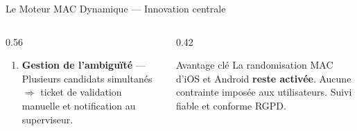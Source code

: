 \documentclass[aspectratio=169, 10pt]{beamer}
\begin{document}
\begin{frame}{Le Moteur MAC Dynamique --- Innovation centrale}
\begin{columns}[T]
\begin{column}{0.56\textwidth}
\begin{enumerate}
        \item \textbf{Gestion de l'ambiguïté} ---
          Plusieurs candidats simultanés $\Rightarrow$ ticket de validation manuelle et notification au superviseur.
      \end{enumerate}
    \end{column}
    \begin{column}{0.42\textwidth}
      \vspace{0.3cm}
      \begin{exampleblock}{\scriptsize Avantage clé}
        \tiny La randomisation MAC d'iOS et Android \textbf{reste activée}. Aucune contrainte imposée aux utilisateurs. Suivi fiable et conforme RGPD.
      \end{exampleblock}
    \end{column}
  \end{columns}
\end{frame}
\end{document}
